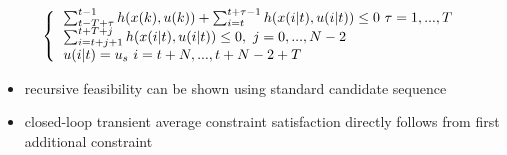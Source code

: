 \begin{equation*}
\left \{
\begin{tabular}{l} 
$\sum_{t-T+\tau}^{t-1} h(x(k),u(k)) + \sum_{i=t}^{t+\tau -1}h(x(i|t), u(i|t)) \le 0 \ \tau = 1, ..., T$ \\
$\sum_{i=t+j+1}^{t+T+j}h(x(i|t),u(i|t)) \leq 0, \ j =0, ..., N-2$ \\
$u(i|t) = u_s \ i = t+N, ... , t+N-2+T$ 
\end{tabular} 
\right .  
\end{equation*}

\begin{itemize}
\item recursive feasibility can be shown using standard candidate sequence
\item closed-loop transient average constraint satisfaction directly follows from first additional constraint
\end{itemize}